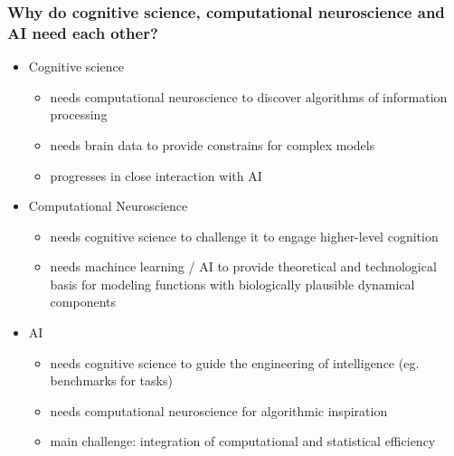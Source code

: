 \documentclass[
t, %
10pt, %
aspectratio=1610, %
ngerman,
english,
]{beamer}
\begin{document}
\begin{frame}
    \frametitle{Why do cognitive science, computational neuroscience and AI need each other?}
    \begin{itemize}
     \item Cognitive science
     \begin{itemize}
      \item needs computational neuroscience to discover algorithms of information processing
      \item needs brain data to provide constrains for complex models
      \item progresses in close interaction with AI
     \end{itemize}
    \item Computational Neuroscience
    \begin{itemize}
     \item needs cognitive science to challenge it to engage higher-level cognition
     \item needs machince learning / AI to provide theoretical and technological basis for modeling functions with biologically plausible dynamical components
    \end{itemize}
    \item AI
    \begin{itemize}
     \item needs cognitive science to guide the engineering of intelligence (eg. benchmarks for tasks)
     \item needs computational neuroscience for algorithmic inspiration
     \item main challenge: integration of computational and statistical efficiency
    \end{itemize}
    \end{itemize}
\end{frame}
\end{document}
